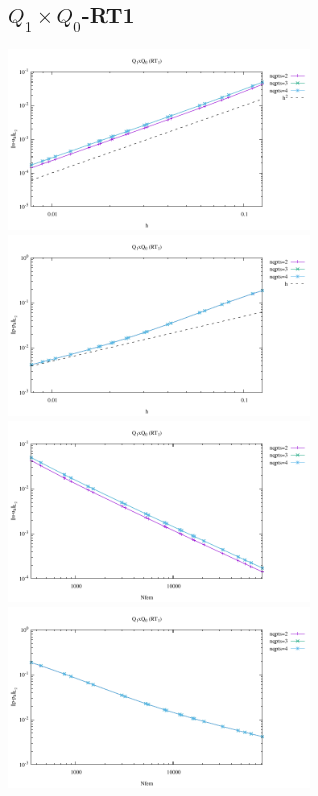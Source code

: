 \newpage
\subsection*{$Q_1\times Q_0$-RT1}
\begin{center}
\includegraphics[width=8cm]{python_codes/fieldstone_120/results/RT1Q0-velocity-h.pdf}
\includegraphics[width=8cm]{python_codes/fieldstone_120/results/RT1Q0-pressure-h.pdf}
\includegraphics[width=8cm]{python_codes/fieldstone_120/results/RT1Q0-velocity-Nfem.pdf}
\includegraphics[width=8cm]{python_codes/fieldstone_120/results/RT1Q0-pressure-Nfem.pdf}
\end{center}

